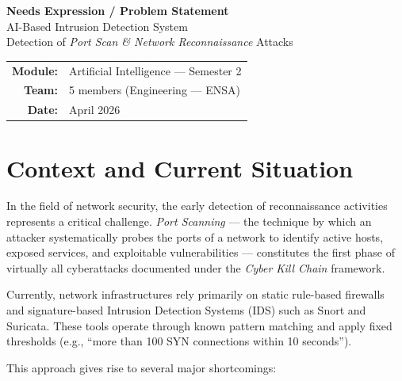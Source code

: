 \documentclass[12pt,a4paper]{article}
\begin{document}
\begin{center}
  {\Large\bfseries Needs Expression / Problem Statement}\\[0.6em]
  {\large AI-Based Intrusion Detection System}\\[0.3em]
  {\large Detection of \textit{Port Scan \& Network Reconnaissance} Attacks}\\[1.2em]
  \begin{tabular}{rl}
    \textbf{Module:}  & Artificial Intelligence --- Semester 2 \\
    \textbf{Team:}    & 5 members (Engineering --- ENSA) \\
    \textbf{Date:}    & April 2026 \\
  \end{tabular}
\end{center}

\vspace{1em}

\section{Context and Current Situation}

In the field of network security, the early detection of reconnaissance
activities represents a critical challenge. \textit{Port Scanning} --- the
technique by which an attacker systematically probes the ports of a network to
identify active hosts, exposed services, and exploitable vulnerabilities ---
constitutes the first phase of virtually all cyberattacks documented under the
\textit{Cyber Kill Chain} framework.

Currently, network infrastructures rely primarily on static rule-based firewalls
and signature-based Intrusion Detection Systems (IDS) such as Snort and
Suricata. These tools operate through known pattern matching and apply fixed
thresholds (e.g., ``more than 100 SYN connections within 10 seconds'').

This approach gives rise to several major shortcomings:
\end{document}
